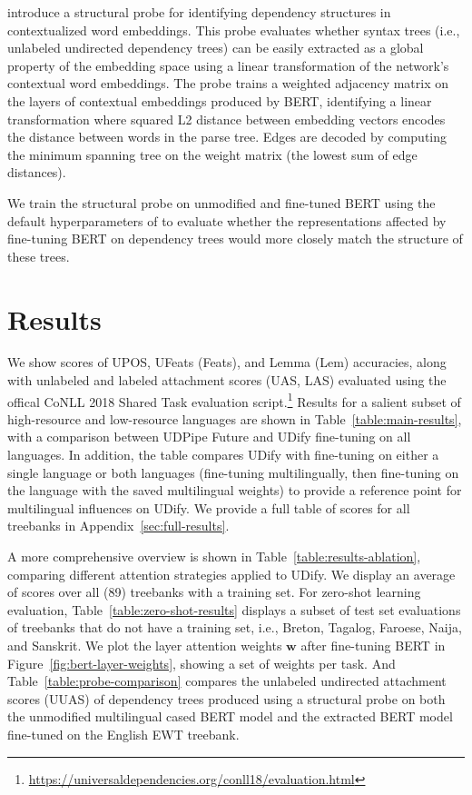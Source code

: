 \documentclass[11pt,a4paper]{article}
\renewcommand{\vec}[1]{\mathbold{#1}}
\begin{document}
 introduce a structural probe for identifying dependency structures in contextualized word embeddings.
This probe evaluates whether syntax trees (i.e., unlabeled undirected dependency trees) can be easily extracted as a global property of the embedding space using a linear transformation of the network's contextual word embeddings.
The probe trains a weighted adjacency matrix on the layers of contextual embeddings produced by BERT, identifying a linear transformation where squared L2 distance between embedding vectors encodes the distance between words in the parse tree.
Edges are decoded by computing the minimum spanning tree on the weight matrix (the lowest sum of edge distances).

We train the structural probe on unmodified and fine-tuned BERT using the default hyperparameters of  to evaluate whether the representations affected by fine-tuning BERT on dependency trees would more closely match the structure of these trees.

\section{Results}

We show scores of {\sc UPOS}, UFeats ({\sc Feats}), and Lemma ({\sc Lem}) accuracies, along with unlabeled and labeled attachment scores ({\sc UAS}, {\sc LAS}) evaluated using the offical CoNLL 2018 Shared Task evaluation script.\footnote{\url{https://universaldependencies.org/conll18/evaluation.html}}
Results for a salient subset of high-resource and low-resource languages are shown in Table~\ref{table:main-results}, with a comparison between UDPipe Future and UDify fine-tuning on all languages. In addition, the table compares UDify with fine-tuning on either a single language or both languages (fine-tuning multilingually, then fine-tuning on the language with the saved multilingual weights) to provide a reference point for multilingual influences on UDify.
We provide a full table of scores for all treebanks in Appendix~\ref{sec:full-results}.

A more comprehensive overview is shown in Table~\ref{table:results-ablation}, comparing different attention strategies applied to UDify.
We display an average of scores over all (89) treebanks with a training set.
For zero-shot learning evaluation, Table~\ref{table:zero-shot-results} displays a subset of test set evaluations of treebanks that do not have a training set, i.e., Breton, Tagalog, Faroese, Naija, and Sanskrit.
We plot the layer attention weights $\vec{w}$ after fine-tuning BERT in Figure~\ref{fig:bert-layer-weights}, showing a set of weights per task.
And Table~\ref{table:probe-comparison} compares the unlabeled undirected attachment scores (UUAS) of dependency trees produced using a structural probe on both the unmodified multilingual cased BERT model and the extracted BERT model fine-tuned on the English EWT treebank.
\end{document}
